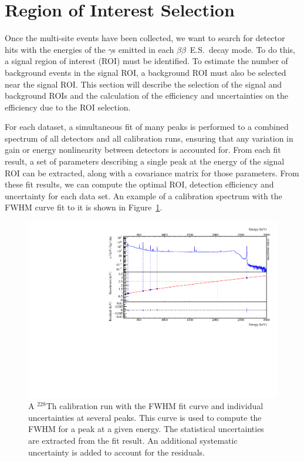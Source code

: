 \documentclass[notitlepage,rmp,aps,10pt]{revtex4-1}
\newcommand{\bb}{${\beta \beta}$}
\newcommand{\bbes}{\bb~E.S.}
\newcommand{\iso}[2]{$^{#1}$#2}
\newcommand{\Th}[1]{\iso{#1}{Th}}
\begin{document}
\section{Region of Interest Selection}
Once the multi-site events have been collected, we want to search for detector hits with the energies of the $\gamma$s emitted in each \bbes\ decay mode.
To do this, a signal region of interest (ROI) must be identified.
To estimate the number of background events in the signal ROI, a background ROI must also be selected near the signal ROI.
This section will describe the selection of the signal and background ROIs and the calculation of the efficiency and uncertainties on the efficiency due to the ROI selection.

For each dataset, a simultaneous fit of many peaks is performed to a combined spectrum of all detectors and all calibration runs, ensuring that any variation in gain or energy nonlinearity between detectors is accounted for.
From each fit result, a set of parameters describing a single peak at the energy of the signal ROI can be extracted, along with a covariance matrix for those parameters.
From these fit results, we can compute the optimal ROI, detection efficiency and uncertainty for each data set.
An example of a calibration spectrum with the FWHM curve fit to it is shown in Figure~\ref{fig:fwhmcal}.
\begin{figure}[h]
  \centering
  \includegraphics[width=.9\linewidth]{fwhmcal}
  \caption[FWHM extracted from a \Th{228} calibration spectrum]{\label{fig:fwhmcal}
    A \Th{228} calibration run with the FWHM fit curve and individual uncertainties at several peaks. This curve is used to compute the FWHM for a peak at a given energy. The statistical uncertainties are extracted from the fit result. An additional systematic uncertainty is added to account for the residuals.
  }
\end{figure}
\end{document}
